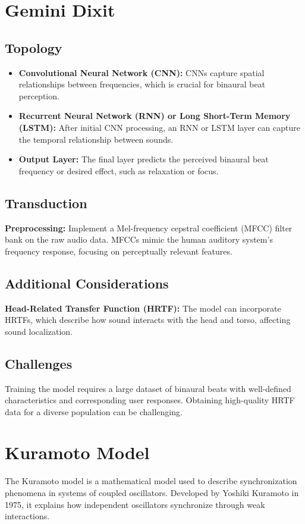 \documentclass{article}
\begin{document}
\section{Gemini Dixit}
\subsection{Topology}
\begin{itemize}
    \item \textbf{Convolutional Neural Network (CNN):} CNNs capture spatial relationships between frequencies, which is crucial for binaural beat perception. 
    \item \textbf{Recurrent Neural Network (RNN) or Long Short-Term Memory (LSTM):} After initial CNN processing, an RNN or LSTM layer can capture the temporal relationship between sounds.
    \item \textbf{Output Layer:} The final layer predicts the perceived binaural beat frequency or desired effect, such as relaxation or focus.
\end{itemize}

\subsection{Transduction}
\textbf{Preprocessing:} Implement a Mel-frequency cepstral coefficient (MFCC) filter bank on the raw audio data. MFCCs mimic the human auditory system’s frequency response, focusing on perceptually relevant features.

\subsection{Additional Considerations}
\textbf{Head-Related Transfer Function (HRTF):} The model can incorporate HRTFs, which describe how sound interacts with the head and torso, affecting sound localization.

\subsection{Challenges}
Training the model requires a large dataset of binaural beats with well-defined characteristics and corresponding user responses. Obtaining high-quality HRTF data for a diverse population can be challenging.

\section{Kuramoto Model}
The Kuramoto model is a mathematical model used to describe synchronization phenomena in systems of coupled oscillators. Developed by Yoshiki Kuramoto in 1975, it explains how independent oscillators synchronize through weak interactions.
\end{document}
